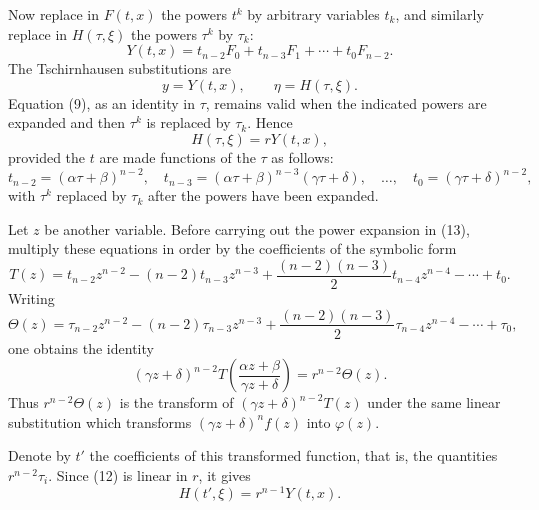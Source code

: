 \documentclass[11pt]{article}
\begin{document}
Now replace in $F(t,x)$ the powers $t^k$ by arbitrary variables $t_k$, and similarly replace in $H(\tau,\xi)$ the powers $\tau^k$ by $\tau_k$:
\begin{equation}
 Y(t,x)=t_{n-2}F_0+t_{n-3}F_1+\cdots+t_0F_{n-2}.
\tag{10}
\end{equation}
The Tschirnhausen substitutions are
\begin{equation}
 y=Y(t,x),
 \qquad
 \eta=H(\tau,\xi).
\tag{11}
\end{equation}
Equation (9), as an identity in $\tau$, remains valid when the indicated powers are expanded and then $\tau^k$ is replaced by $\tau_k$. Hence
\begin{equation}
 H(\tau,\xi)=rY(t,x),
\tag{12}
\end{equation}
provided the $t$ are made functions of the $\tau$ as follows:
\begin{equation}
 t_{n-2}= (\alpha\tau+\beta)^{n-2},
 \quad
 t_{n-3}= (\alpha\tau+\beta)^{n-3}(\gamma\tau+\delta),
 \quad\ldots,
 \quad
 t_0=(\gamma\tau+\delta)^{n-2},
\tag{13}
\end{equation}
with $\tau^k$ replaced by $\tau_k$ after the powers have been expanded.

Let $z$ be another variable. Before carrying out the power expansion in (13), multiply these equations in order by the coefficients of the symbolic form
\begin{equation}
 T(z)=t_{n-2}z^{n-2}-(n-2)t_{n-3}z^{n-3}+\frac{(n-2)(n-3)}{2}t_{n-4}z^{n-4}-\cdots+t_0.
\tag{14}
\end{equation}
Writing
\begin{equation}
 \Theta(z)=\tau_{n-2}z^{n-2}-(n-2)\tau_{n-3}z^{n-3}+\frac{(n-2)(n-3)}2\tau_{n-4}z^{n-4}-\cdots+\tau_0,
\tag{15}
\end{equation}
one obtains the identity
\begin{equation}
 (\gamma z+\delta)^{n-2}T\!\left(\frac{\alpha z+\beta}{\gamma z+\delta}\right)=r^{n-2}\Theta(z).
\tag{16}
\end{equation}
Thus $r^{n-2}\Theta(z)$ is the transform of $(\gamma z+\delta)^{n-2}T(z)$ under the same linear substitution which transforms $(\gamma z+\delta)^nf(z)$ into $\varphi(z)$.

Denote by $t'$ the coefficients of this transformed function, that is, the quantities $r^{n-2}\tau_i$. Since (12) is linear in $r$, it gives
\begin{equation}
 H(t',\xi)=r^{n-1}Y(t,x).
\tag{17}
\end{equation}
\end{document}
